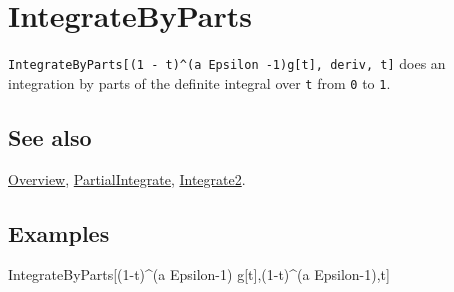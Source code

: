 \documentclass[../FeynCalcManual.tex]{subfiles}
\begin{document}
\hypertarget{integratebyparts}{%
\section{IntegrateByParts}\label{integratebyparts}}

\texttt{IntegrateByParts[\allowbreak{}(1 - t)^(a Epsilon -1)g[\allowbreak{}t],\ \allowbreak{}deriv,\ \allowbreak{}t]}
does an integration by parts of the definite integral over \texttt{t}
from \texttt{0} to \texttt{1}.

\subsection{See also}

\hyperlink{toc}{Overview},
\hyperlink{partialintegrate}{PartialIntegrate},
\hyperlink{integrate2}{Integrate2}.

\subsection{Examples}

IntegrateByParts{[}(1-t)\^{}(a Epsilon-1) g{[}t{]},(1-t)\^{}(a
Epsilon-1),t{]}
\end{document}
